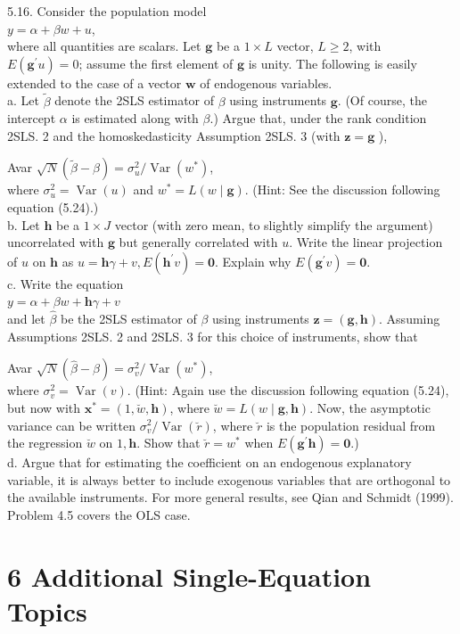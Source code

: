 \documentclass[10pt]{article}
\begin{document}
5.16. Consider the population model\\
$y=\alpha+\beta w+u$,\\
where all quantities are scalars. Let $\mathbf{g}$ be a $1 \times L$ vector, $L \geq 2$, with $E\left(\mathbf{g}^{\prime} u\right)=0$; assume the first element of $\mathbf{g}$ is unity. The following is easily extended to the case of a vector $\mathbf{w}$ of endogenous variables.\\
a. Let $\tilde{\beta}$ denote the 2SLS estimator of $\beta$ using instruments $\mathbf{g}$. (Of course, the intercept $\alpha$ is estimated along with $\beta$.) Argue that, under the rank condition 2SLS. 2 and the homoskedasticity Assumption 2SLS. 3 (with $\mathbf{z = g}$ ),

Avar $\sqrt{N}(\tilde{\beta}-\beta)=\sigma_{u}^{2} / \operatorname{Var}\left(w^{*}\right)$,\\
where $\sigma_{u}^{2}=\operatorname{Var}(u)$ and $w^{*}=L(w \mid \mathbf{g})$. (Hint: See the discussion following equation (5.24).)\\
b. Let $\mathbf{h}$ be a $1 \times J$ vector (with zero mean, to slightly simplify the argument) uncorrelated with $\mathbf{g}$ but generally correlated with $u$. Write the linear projection of $u$ on $\mathbf{h}$ as $u=\mathbf{h} \gamma+v, E\left(\mathbf{h}^{\prime} v\right)=\mathbf{0}$. Explain why $E\left(\mathbf{g}^{\prime} v\right)=\mathbf{0}$.\\
c. Write the equation\\
$y=\alpha+\beta w+\mathbf{h} \gamma+v$\\
and let $\hat{\beta}$ be the 2SLS estimator of $\beta$ using instruments $\mathbf{z}=(\mathbf{g}, \mathbf{h})$. Assuming Assumptions 2SLS. 2 and 2SLS. 3 for this choice of instruments, show that

Avar $\sqrt{N}(\hat{\beta}-\beta)=\sigma_{v}^{2} / \operatorname{Var}\left(w^{*}\right)$,\\
where $\sigma_{v}^{2}=\operatorname{Var}(v)$. (Hint: Again use the discussion following equation (5.24), but now with $\mathbf{x}^{*}=(1, \breve{w}, \mathbf{h})$, where $\breve{w}=L(w \mid \mathbf{g}, \mathbf{h})$. Now, the asymptotic variance can be written $\sigma_{v}^{2} / \operatorname{Var}(\breve{r})$, where $\breve{r}$ is the population residual from the regression $\breve{w}$ on $1, \mathbf{h}$. Show that $\breve{r}=w^{*}$ when $E\left(\mathbf{g}^{\prime} \mathbf{h}\right)=\mathbf{0}$.)\\
d. Argue that for estimating the coefficient on an endogenous explanatory variable, it is always better to include exogenous variables that are orthogonal to the available instruments. For more general results, see Qian and Schmidt (1999). Problem 4.5 covers the OLS case.

\section*{6 Additional Single-Equation Topics}
\end{document}
